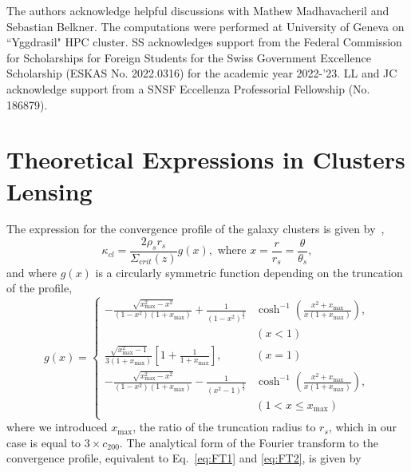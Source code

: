 \documentclass[prd, superscriptaddress, tightenlines, longbibliography, nofootinbib, eqsecnum, amsfonts, amsmath, floatfix, twocolumn, notitlepage]{revtex4-2}
\begin{document}
\begin{acknowledgements}
The authors acknowledge helpful discussions with Mathew Madhavacheril and Sebastian Belkner. The computations were performed at University of Geneva on ``Yggdrasil" HPC cluster. SS acknowledges support from the Federal Commission for Scholarships for Foreign Students for the Swiss Government Excellence Scholarship (ESKAS No. 2022.0316) for the academic year 2022-'23. LL and JC acknowledge support from a SNSF Eccellenza Professorial Fellowship (No. 186879).

\end{acknowledgements}

\appendix
\section{Theoretical Expressions in Clusters Lensing}\label{A2}
The expression for the convergence profile of the galaxy clusters is given by~\cite{Takada:2002qq},
\begin{equation}
    \kappa_{cl} = \frac{2\rho_s r_s}{\Sigma_{crit}(z)}g(x), \text{ where } x=\frac{r}{r_s} = \frac{\theta}{\theta_s},
\end{equation}
and where $g(x)$ is a circularly symmetric function depending on the truncation of the profile,
\begin{equation}
    g(x) = 
     \begin{cases}
       -\frac{\sqrt{x_{\text{max}}^2-x^2}}{(1-x^2)(1+x_{\text{max}})} + \frac{1}{(1-x^2)^{\frac{3}{2}}}&\cosh^{-1}\left(\frac{x^2+x_{\text{max}}}{x(1+x_{\text{max}})}\right),  \\ &(x < 1)\\
       \frac{\sqrt{x_{\text{max}}^2 - 1}}{3(1+x_{\text{max}})}\left[ 1+\frac{1}{1+x_{\text{max}}} \right],  &(x = 1)\\
       -\frac{\sqrt{x_{\text{max}}^2-x^2}}{(1-x^2)(1+x_{\text{max}})} - \frac{1}{(x^2-1)^{\frac{3}{2}}}&\cosh^{-1}\left(\frac{x^2+x_{\text{max}}}{x(1+x_{\text{max}})}\right),  \\
       &(1< x \leq x_{\text{max}})\\
     \end{cases}
\end{equation}
where we introduced $x_{\text{max}}$, the ratio of the truncation radius to $r_s$, which in our case is equal to $3\times c_{200}$. 
The analytical form of the Fourier transform to the convergence profile, equivalent to Eq.~\ref{eq:FT1} and \ref{eq:FT2}, is given by \cite{Scoccimarro:2000gm, 2011PhRvD..83b3008O, Takada:2002qq}%
\end{document}
